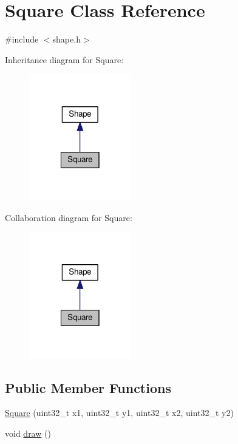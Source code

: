 \hypertarget{class_square}{\section{Square Class Reference}
\label{class_square}
}


{\ttfamily \#include $<$shape.\-h$>$}



Inheritance diagram for Square\-:
\nopagebreak
\begin{figure}[H]
\begin{center}
\leavevmode
\includegraphics[width=126pt]{class_square__inherit__graph}
\end{center}
\end{figure}


Collaboration diagram for Square\-:
\nopagebreak
\begin{figure}[H]
\begin{center}
\leavevmode
\includegraphics[width=126pt]{class_square__coll__graph}
\end{center}
\end{figure}
\subsection*{Public Member Functions}
\begin{DoxyCompactItemize}
\item 
\hyperlink{class_square_afd27b0650fb7baa1dacb2a452aba121e}{Square} (uint32\-\_\-t x1, uint32\-\_\-t y1, uint32\-\_\-t x2, uint32\-\_\-t y2)
\item 
void \hyperlink{class_square_a2a8be87e5cb58dd25a8af0f6166536b9}{draw} ()
\end{DoxyCompactItemize}
